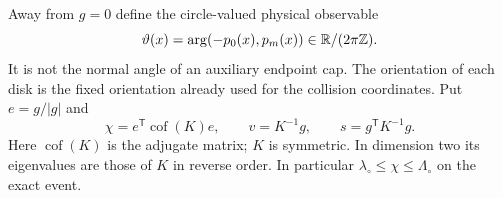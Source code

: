 Away from $g=0$ define the circle-valued physical observable
\begin{equation}\label{eq:v77-angle}
 \vartheta(x)=\arg(-p_0(x),p_m(x))\in\R/(2\pi\Z).
\end{equation}
It is not the normal angle of an auxiliary endpoint cap. The
orientation of each disk is the fixed orientation already used
for the collision coordinates. Put $e=g/|g|$ and
\begin{equation}\label{eq:v77-chi}
 \chi=e^{\mathsf T}\operatorname{cof}(K)e,
 \qquad v=K^{-1}g,\qquad s=g^{\mathsf T}K^{-1}g.
\end{equation}
Here $\operatorname{cof}(K)$ is the adjugate matrix; $K$ is symmetric.
In dimension two its eigenvalues are those of $K$ in reverse order.
In particular $\lambda_\circ\le\chi\le\Lambda_\circ$ on the exact event.

